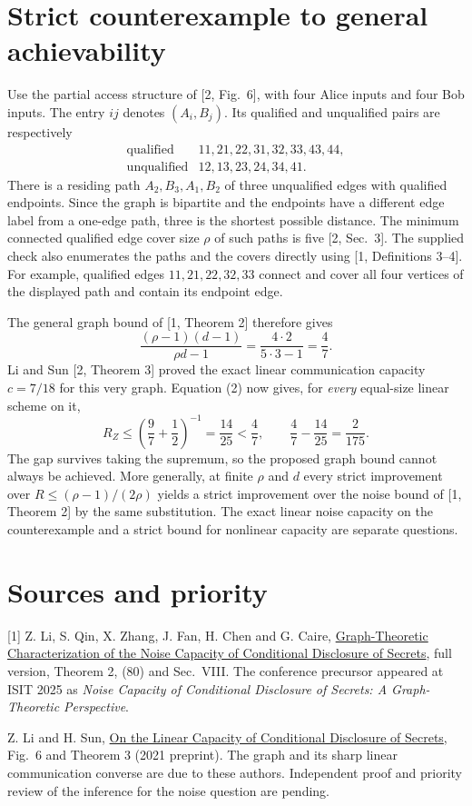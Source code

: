 \documentclass[11pt]{article}
\begin{document}
\section{Strict counterexample to general achievability}
Use the partial access structure of [2, Fig.~6], with four Alice inputs and four Bob inputs. The entry $ij$ denotes $(A_i,B_j)$. Its qualified and unqualified pairs are respectively
\[
 \begin{array}{ll}
 \text{qualified}&11,21,22,31,32,33,43,44,\\
 \text{unqualified}&12,13,23,24,34,41.
 \end{array}
\]
There is a residing path $A_2,B_3,A_1,B_2$ of three unqualified edges with qualified endpoints. Since the graph is bipartite and the endpoints have a different edge label from a one-edge path, three is the shortest possible distance. The minimum connected qualified edge cover size $\rho$ of such paths is five [2, Sec.~3]. The supplied check also enumerates the paths and the covers directly using [1, Definitions 3--4]. For example, qualified edges $11,21,22,32,33$ connect and cover all four vertices of the displayed path and contain its endpoint edge.

The general graph bound of [1, Theorem 2] therefore gives
\[
 \frac{(\rho-1)(d-1)}{\rho d-1}=\frac{4\cdot 2}{5\cdot3-1}=\frac47 .
\]
Li and Sun [2, Theorem 3] proved the exact linear communication capacity $c=7/18$ for this very graph. Equation (2) now gives, for \emph{every} equal-size linear scheme on it,
\[
 R_Z\le \left(\frac9{7}+\frac12\right)^{-1}=\frac{14}{25}
       <\frac47,\qquad \frac47-\frac{14}{25}=\frac2{175}.
\]
The gap survives taking the supremum, so the proposed graph bound cannot always be achieved. More generally, at finite $\rho$ and $d$ every strict improvement over $R\le(\rho-1)/(2\rho)$ yields a strict improvement over the noise bound of [1, Theorem 2] by the same substitution. The exact linear noise capacity on the counterexample and a strict bound for nonlinear capacity are separate questions.

\section*{Sources and priority}
[1] Z. Li, S. Qin, X. Zhang, J. Fan, H. Chen and G. Caire, \href{https://arxiv.org/abs/2510.22671v2}{Graph-Theoretic Characterization of the Noise Capacity of Conditional Disclosure of Secrets}, full version, Theorem 2, (80) and Sec.~VIII. The conference precursor appeared at ISIT 2025 as \emph{Noise Capacity of Conditional Disclosure of Secrets: A Graph-Theoretic Perspective}.\par
[2] Z. Li and H. Sun, \href{https://arxiv.org/abs/2106.04483}{On the Linear Capacity of Conditional Disclosure of Secrets}, Fig.~6 and Theorem 3 (2021 preprint). The graph and its sharp linear communication converse are due to these authors. Independent proof and priority review of the inference for the noise question are pending.
\end{document}
